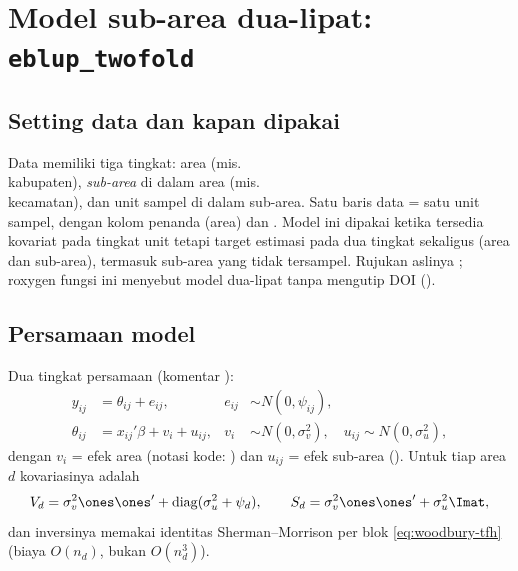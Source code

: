 \section{Model sub-area dua-lipat: \texttt{eblup\_twofold}}\label{sec:twofold}

\subsection{Setting data dan kapan dipakai}\label{sec:twofold-setting}

Data memiliki tiga tingkat: area (mis.\\ kabupaten), \emph{sub-area} di dalam
area (mis.\\ kecamatan), dan unit sampel di dalam sub-area. Satu baris data =
satu unit sampel, dengan kolom penanda  (area) dan
. Model ini dipakai ketika tersedia kovariat pada tingkat unit
tetapi target estimasi pada dua tingkat sekaligus (area dan sub-area),
termasuk sub-area yang tidak tersampel. Rujukan aslinya
\citet{torabi2014small}; roxygen fungsi ini menyebut model dua-lipat tanpa
mengutip DOI ().

\subsection{Persamaan model}\label{sec:twofold-model}

Dua tingkat persamaan (komentar ):
\begin{align}
  y_{ij} &= \theta_{ij}+e_{ij}, & e_{ij}&\sim N(0,\psi_{ij}),
    \label{eq:tf-lvl1}\\
  \theta_{ij} &= x_{ij}'\beta+v_i+u_{ij}, &
    v_i&\sim N(0,\sigma_v^2),\quad u_{ij}\sim N(0,\sigma_u^2),
    \label{eq:tf-lvl2}
\end{align}
dengan $v_i$ = efek area (notasi kode: ) dan $u_{ij}$ = efek
sub-area (). Untuk tiap area $d$ kovariasinya adalah
\begin{equation}
  V_d=\sigma_v^2\ones\ones'
  +\mathrm{diag}(\sigma_u^2+\psi_d),
  \qquad
  S_d=\sigma_v^2\ones\ones'+\sigma_u^2\Imat,
  \label{eq:tf-block}
\end{equation}
dan inversinya memakai identitas Sherman--Morrison per blok
\eqref{eq:woodbury-tfh} (biaya $O(n_d)$, bukan $O(n_d^3)$).

